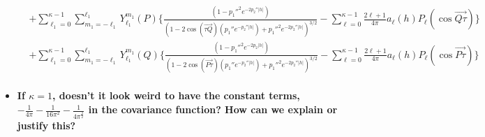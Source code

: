 \documentclass[11pt]{article}
\begin{document}
\begin{itemize}
\begin{align*}
&+ \sum_{\ell_1=0}^{\kappa-1} \sum_{m_1=-\ell_1}^{\ell_1} Y_{\ell_1}^{m_1}(P) \biggl\{ \frac{(1 - {p_1''}^2 e^{-2 p_2'' \lvert h \lvert})}{(1-2 \cos{(\overrightarrow{\tau Q})} (p_1'' e^{-p_2'' \lvert h \lvert}) + {p_1''}^2 e^{-2p_2'' \lvert h \lvert})^{3/2}} - \sum_{\ell=0}^{\kappa-1} \frac{2\ell+1}{4\pi} a_{\ell}(h)  P_\ell(\cos{\overrightarrow{Q\tau}}) \biggl\}\\
& + \sum_{\ell_1=0}^{\kappa-1} \sum_{m_1=-\ell_1}^{\ell_1} Y_{\ell_1}^{m_1}(Q) \biggl\{\frac{(1 - {p_1''}^2 e^{-2 p_2 \lvert h \lvert})}{(1-2 \cos{(\overrightarrow{P \tau})} (p_1'' e^{-p_2'' \lvert h \lvert}) + {p_1''}^2 e^{-2p_2'' \lvert h \lvert})^{3/2}} - \sum_{\ell=0}^{\kappa-1} \frac{2\ell+1}{4\pi} a_{\ell}(h)  P_\ell(\cos{\overrightarrow{P\tau}}) \biggl\}\\
\end{align*}

\item
\textbf{{\color{red} If $\kappa=1$, doesn't it look weird to have the constant terms, $-\frac{1}{4\pi} - \frac{1}{16\pi^2} - \frac{1}{4\pi^\frac{3}{2}}$ in the covariance function? How can we explain or justify this?}}\\


\end{itemize}
\end{document}
